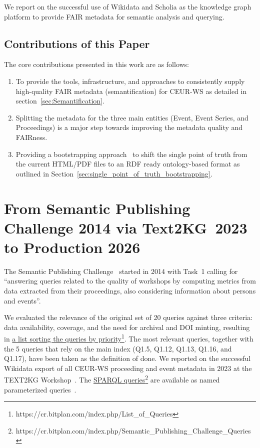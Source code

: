 \documentclass[runningheads]{llncs}
\newcommand{\tquote}[1]{``#1''}
\newcommand{\footnotelink}[2]{\href{#1}{#2}\footnote{#1}}
\begin{document}
We report on the successful use of Wikidata and Scholia as the knowledge graph platform to provide FAIR metadata for semantic analysis and querying.

\subsection{Contributions of this Paper}
The core contributions presented in this work are as follows:
\begin{enumerate}
    \item To provide the tools, infrastructure, and approaches to consistently supply high-quality FAIR metadata (semantification) for CEUR-WS as detailed in section~\ref{sec:Semantification}.

    \item Splitting the metadata for the three main entities (Event, Event Series, and Proceedings) is a major step towards improving the metadata quality and FAIRness.

    \item Providing a bootstrapping approach~\cite{Bardini2001,Engelbart2007} to shift the single point of truth from the current HTML/PDF files to an RDF ready ontology-based format as outlined in Section~\ref{sec:single_point_of_truth_bootstrapping}.

\end{enumerate}


\section{From Semantic Publishing Challenge 2014 via Text2KG~2023 to Production 2026}\label{sec:SemantificationStory}
The Semantic Publishing Challenge~\cite{Lange2014,DiIorio2015,Ronzano_2014} started in 2014 with Task~1 calling for \tquote{answering queries related to the quality of workshops by computing metrics from data extracted from their proceedings, also considering information about persons and events}.

We evaluated the relevance of the original set of 20 queries against three criteria: data availability, coverage, and the need for archival and DOI minting, resulting in \footnotelink{https://cr.bitplan.com/index.php/List\_of\_Queries}{a list sorting the queries by priority}. The most relevant queries, together with the 5 queries that rely on the main index (Q1.5, Q1.12, Q1.13, Q1.16, and Q1.17), have been taken as the definition of done. We reported on the successful Wikidata export of all CEUR-WS proceeding and event metadata in 2023 at the TEXT2KG Workshop~\cite{FahlHOD23}.
The \footnotelink{https://cr.bitplan.com/index.php/Semantic\_Publishing\_Challenge\_Queries}{SPARQL queries} are available as named parameterized queries~\cite{snapquery}. 
\end{document}
